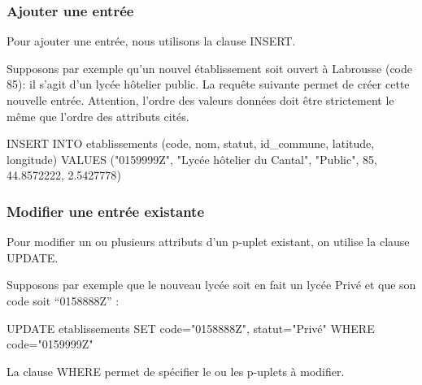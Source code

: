 \documentclass[
  letterpaper,
  DIV=11,
  numbers=noendperiod]{scrartcl}
\newenvironment{Shaded}{\begin{snugshade}}{\end{snugshade}}
\newcommand{\DecValTok}[1]{\textcolor[rgb]{0.68,0.00,0.00}{#1}}
\newcommand{\FloatTok}[1]{\textcolor[rgb]{0.68,0.00,0.00}{#1}}
\newcommand{\KeywordTok}[1]{\textcolor[rgb]{0.00,0.23,0.31}{#1}}
\newcommand{\NormalTok}[1]{\textcolor[rgb]{0.00,0.23,0.31}{#1}}
\newcommand{\OperatorTok}[1]{\textcolor[rgb]{0.37,0.37,0.37}{#1}}
\newcommand{\OtherTok}[1]{\textcolor[rgb]{0.00,0.23,0.31}{#1}}
\begin{document}
\hypertarget{ajouter-une-entruxe9e}{%
\subsubsection{Ajouter une entrée}\label{ajouter-une-entruxe9e}}

Pour ajouter une entrée, nous utilisons la clause INSERT.

Supposons par exemple qu'un nouvel établissement soit ouvert à Labrousse
(code 85): il s'agit d'un lycée hôtelier public. La requête suivante
permet de créer cette nouvelle entrée. Attention, l'ordre des valeurs
données doit être strictement le même que l'ordre des attributs cités.

\begin{Shaded}
\begin{Highlighting}[]
\KeywordTok{INSERT} \KeywordTok{INTO}\NormalTok{ etablissements}
\NormalTok{(code, nom, statut, id\_commune, latitude, longitude)}
\KeywordTok{VALUES}
\NormalTok{(}\OtherTok{"0159999Z"}\NormalTok{, }\OtherTok{"Lycée hôtelier du Cantal"}\NormalTok{, }\OtherTok{"Public"}\NormalTok{, }\DecValTok{85}\NormalTok{, }\FloatTok{44.8572222}\NormalTok{, }\FloatTok{2.5427778}\NormalTok{)}
\end{Highlighting}
\end{Shaded}

\hypertarget{modifier-une-entruxe9e-existante}{%
\subsubsection{Modifier une entrée
existante}\label{modifier-une-entruxe9e-existante}}

Pour modifier un ou plusieurs attributs d'un p-uplet existant, on
utilise la clause UPDATE.

Supposons par exemple que le nouveau lycée soit en fait un lycée Privé
et que son code soit ``0158888Z'' :

\begin{Shaded}
\begin{Highlighting}[]
\KeywordTok{UPDATE}\NormalTok{ etablissements}
\KeywordTok{SET}\NormalTok{ code}\OperatorTok{=}\OtherTok{"0158888Z"}\NormalTok{, statut}\OperatorTok{=}\OtherTok{"Privé"}
\KeywordTok{WHERE}\NormalTok{ code}\OperatorTok{=}\OtherTok{"0159999Z"}
\end{Highlighting}
\end{Shaded}

La clause WHERE permet de spécifier le ou les p-uplets à modifier.
\end{document}
